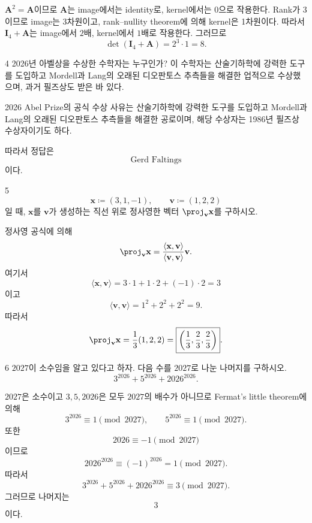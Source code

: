 \begin{solution}
$\mathbf{A}^2=\mathbf{A}$이므로 $\mathbf{A}$는 image에서는 identity로, kernel에서는 $0$으로 작용한다. Rank가 $3$이므로 image는 3차원이고, rank--nullity theorem에 의해 kernel은 1차원이다. 따라서 $\mathbf{I}_4+\mathbf{A}$는 image에서 $2$배, kernel에서 $1$배로 작용한다. 그러므로
\[
    \det\!\left(\mathbf{I}_4+\mathbf{A}\right)
    =2^3\cdot1
    =\boxed{8}.
\]
\end{solution}

\begin{problem}{4}
2026년 아벨상을 수상한 수학자는 누구인가? 이 수학자는 산술기하학에 강력한 도구를 도입하고 Mordell과 Lang의 오래된 디오판토스 추측들을 해결한 업적으로 수상했으며, 과거 필즈상도 받은 바 있다.
\end{problem}

\begin{solution}
2026 Abel Prize의 공식 수상 사유는 산술기하학에 강력한 도구를 도입하고 Mordell과 Lang의 오래된 디오판토스 추측들을 해결한 공로이며, 해당 수상자는 1986년 필즈상 수상자이기도 하다.

따라서 정답은
\[
    \boxed{\text{Gerd Faltings}}
\]
이다.
\end{solution}

\begin{problem}{5}
\[
    \mathbf{x}\coloneqq (3,1,-1),
    \qquad
    \mathbf{v}\coloneqq (1,2,2)
\]
일 때, $\mathbf{x}$를 $\mathbf{v}$가 생성하는 직선 위로 정사영한 벡터 $\proj_{\mathbf{v}}\mathbf{x}$를 구하시오.
\end{problem}

\begin{solution}
정사영 공식에 의해
\[
    \proj_{\mathbf{v}}\mathbf{x}
    =
    \frac{\langle\mathbf{x},\mathbf{v}\rangle}
    {\langle\mathbf{v},\mathbf{v}\rangle}\mathbf{v}.
\]
여기서
\[
    \langle\mathbf{x},\mathbf{v}\rangle
    =3\cdot1+1\cdot2+(-1)\cdot2
    =3
\]
이고
\[
    \langle\mathbf{v},\mathbf{v}\rangle
    =1^2+2^2+2^2
    =9.
\]
따라서
\[
    \proj_{\mathbf{v}}\mathbf{x}
    =\frac13(1,2,2)
    =
    \boxed{\left(\frac13,\frac23,\frac23\right)}.
\]
\end{solution}

\begin{problem}{6}
$2027$이 소수임을 알고 있다고 하자. 다음 수를 $2027$로 나눈 나머지를 구하시오.
\[
    3^{2026}+5^{2026}+2026^{2026}.
\]
\end{problem}

\begin{solution}
$2027$은 소수이고 $3,5,2026$은 모두 $2027$의 배수가 아니므로 Fermat's little theorem에 의해
\[
    3^{2026}\equiv1\pmod{2027},
    \qquad
    5^{2026}\equiv1\pmod{2027}.
\]
또한
\[
    2026\equiv-1\pmod{2027}
\]
이므로
\[
    2026^{2026}\equiv(-1)^{2026}=1\pmod{2027}.
\]
따라서
\[
    3^{2026}+5^{2026}+2026^{2026}
    \equiv3\pmod{2027}.
\]
그러므로 나머지는
\[
    \boxed{3}
\]
이다.
\end{solution}

